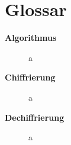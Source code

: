 \chapter{Glossar}
\label{xx_glossar}




\begin{description}

\item[\bf{Algorithmus}] a

\item[\bf{Chiffrierung}] a

\item[\bf{Dechiffrierung}] a

\end{description}

